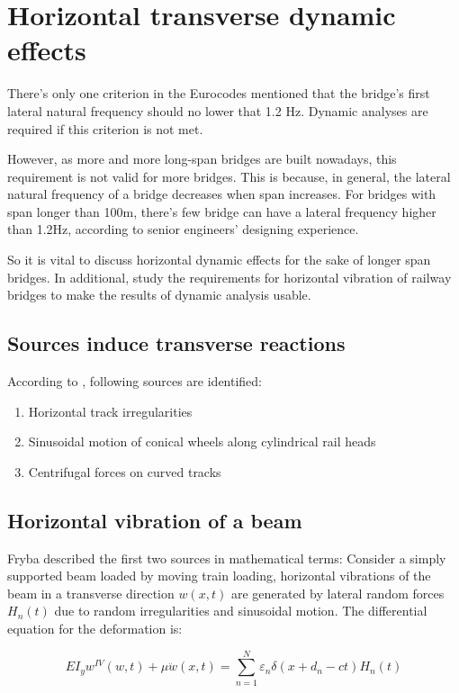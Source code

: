 \section{Horizontal transverse dynamic effects}
There's only one criterion in the Eurocodes mentioned that the bridge's first lateral natural frequency should no lower that 1.2 Hz. Dynamic analyses are required if this criterion is not met. 

However, as more and more long-span bridges are built nowadays, this requirement is not valid for more bridges. This is because, in general, the lateral natural frequency of a bridge decreases when span increases. For bridges with span longer than 100m, there's few bridge can have a lateral frequency higher than 1.2Hz, according to senior engineers' designing experience.

So it is vital to discuss horizontal dynamic effects for the sake of longer span bridges. In additional, study the requirements for horizontal vibration of railway bridges to make the results of dynamic analysis usable.

\subsection{Sources induce transverse reactions}
According to \cite{da2007dynamic}\cite{fryba1996dynamics}\cite{EC12}, following sources are identified:

\begin{enumerate} [-]
	\item Horizontal track irregularities
	\item Sinusoidal motion of conical wheels along cylindrical rail heads
	\item Centrifugal forces on curved tracks
\end{enumerate}

\subsection{Horizontal vibration of a beam}

Fryba\cite{fryba1996dynamics} described the first two sources in mathematical terms:
Consider a simply supported beam loaded by moving train loading, horizontal vibrations of the beam in a transverse direction $ w(x,t) $ are generated by lateral random forces $ H_n (t) $ due to random irregularities and sinusoidal motion. The differential equation for the deformation is:

\begin{equation}
	EI_yw^{IV}(w,t)+\mu \ddot{w} (x,t)=\sum_{n=1}^{N} \varepsilon_n\delta(x+d_n-ct)H_n(t) 
\end{equation}

